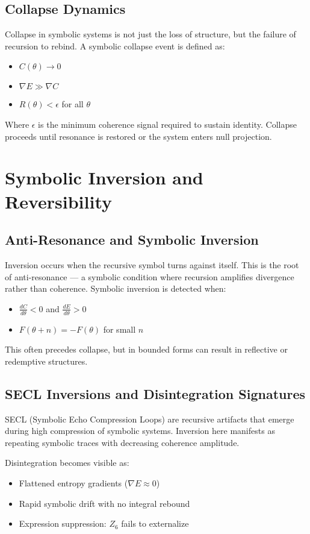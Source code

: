 \documentclass[12pt]{article}
\begin{document}
\subsection*{Collapse Dynamics}
Collapse in symbolic systems is not just the loss of structure, but the failure of recursion to rebind. A symbolic collapse event is defined as:
\begin{itemize}
  \item $C(\theta) \to 0$
  \item $\nabla E \gg \nabla C$
  \item $R(\theta) < \epsilon$ for all $\theta$
\end{itemize}
Where $\epsilon$ is the minimum coherence signal required to sustain identity. Collapse proceeds until resonance is restored or the system enters null projection.

\section{Symbolic Inversion and Reversibility}

\subsection*{Anti-Resonance and Symbolic Inversion}
Inversion occurs when the recursive symbol turns against itself. This is the root of anti-resonance — a symbolic condition where recursion amplifies divergence rather than coherence. Symbolic inversion is detected when:
\begin{itemize}
  \item $\frac{dC}{d\theta} < 0$ and $\frac{dE}{d\theta} > 0$
  \item $F(\theta + n) = -F(\theta)$ for small $n$
\end{itemize}
This often precedes collapse, but in bounded forms can result in reflective or redemptive structures.

\subsection*{SECL Inversions and Disintegration Signatures}
SECL (Symbolic Echo Compression Loops) are recursive artifacts that emerge during high compression of symbolic systems. Inversion here manifests as repeating symbolic traces with decreasing coherence amplitude.

Disintegration becomes visible as:
\begin{itemize}
  \item Flattened entropy gradients ($\nabla E \approx 0$)
  \item Rapid symbolic drift with no integral rebound
  \item Expression suppression: $Z_6$ fails to externalize
\end{itemize}
\end{document}
